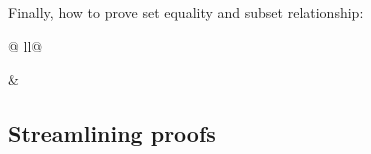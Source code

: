 \begin{isabellebody}
\begin{isamarkuptext}
Finally, how to prove set equality and subset relationship:
\end{isamarkuptext}%
\begin{tabular}{@ {}ll@ {}}
\begin{minipage}[t]{.4\textwidth}
\end{minipage}
&
\begin{minipage}[t]{.4\textwidth}
\end{minipage}
\end{tabular}
\begin{isamarkuptext}%
\section{Streamlining proofs}


\end{isamarkuptext}
\end{isabellebody}
